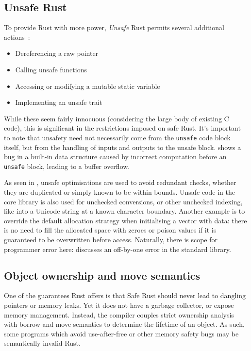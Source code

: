 \documentclass[dissertation.tex]{subfiles}
\begin{document}
\subsection{Unsafe Rust}
\label{sec:rust-unsafe}

To provide Rust with more power, \emph{Unsafe} Rust permits several
additional actions~\cite{rust-trpl-book}:

\begin{itemize}
    \item Dereferencing a raw pointer
    \item Calling unsafe functions
    \item Accessing or modifying a mutable static variable
    \item Implementing an unsafe trait
\end{itemize}

While these seem fairly innocuous (considering the large body of
existing C code), this is significant in the restrictions imposed on
safe Rust.
It's important to note that unsafety need not necessarily come from
the \texttt{unsafe} code block itself, but from the handling of inputs
and outputs to the unsafe block.
 shows a bug in a built-in data structure
caused by incorrect computation before an \texttt{unsafe} block, leading
to a buffer overflow.

As seen in , unsafe optimisations are used to
avoid redundant checks, whether they are duplicated or simply known to
be within bounds.
Unsafe code in the core library is also used for unchecked conversions,
or other unchecked indexing, like into a Unicode string at a known
character boundary.
Another example is to override the default allocation strategy
when initialising a vector with data: there is no need to fill the
allocated space with zeroes or poison values if it is guaranteed to be
overwritten before access.
Naturally, there is scope for programmer error here:
 discusses an off-by-one error in
the standard library.


\subsection{Object ownership and move semantics}
\label{sec:rust-borrow}


One of the guarantees Rust offers is that Safe Rust should never lead to
dangling pointers or memory leaks.
Yet it does not have a garbage collector, or expose memory management.
Instead, the compiler couples strict ownership analysis with borrow and
move semantics to determine the lifetime of an object.
As such, some programs which avoid use-after-free or other memory safety
bugs may be semantically invalid Rust.
\end{document}
